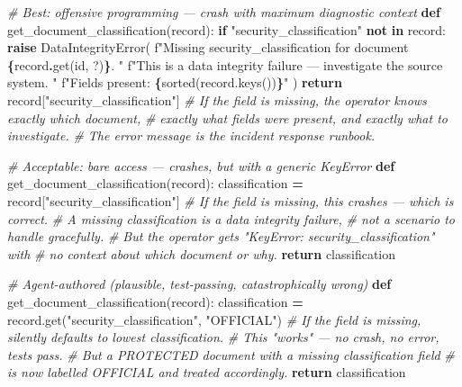 \documentclass[a4paper,11pt]{report}
\newenvironment{Shaded}{\begin{snugshade}}{\end{snugshade}}
\newcommand{\BuiltInTok}[1]{#1}
\newcommand{\CommentTok}[1]{\textcolor[rgb]{0.56,0.35,0.01}{\textit{#1}}}
\newcommand{\ControlFlowTok}[1]{\textcolor[rgb]{0.13,0.29,0.53}{\textbf{#1}}}
\newcommand{\KeywordTok}[1]{\textcolor[rgb]{0.13,0.29,0.53}{\textbf{#1}}}
\newcommand{\NormalTok}[1]{#1}
\newcommand{\OperatorTok}[1]{\textcolor[rgb]{0.81,0.36,0.00}{\textbf{#1}}}
\newcommand{\SpecialCharTok}[1]{\textcolor[rgb]{0.81,0.36,0.00}{\textbf{#1}}}
\newcommand{\SpecialStringTok}[1]{\textcolor[rgb]{0.31,0.60,0.02}{#1}}
\newcommand{\StringTok}[1]{\textcolor[rgb]{0.31,0.60,0.02}{#1}}
\begin{document}
\begin{Shaded}
\begin{Highlighting}[]
\CommentTok{\# Best: offensive programming — crash with maximum diagnostic context}
\KeywordTok{def}\NormalTok{ get\_document\_classification(record):}
    \ControlFlowTok{if} \StringTok{"security\_classification"} \KeywordTok{not} \KeywordTok{in}\NormalTok{ record:}
        \ControlFlowTok{raise}\NormalTok{ DataIntegrityError(}
            \SpecialStringTok{f"Missing security\_classification for document }\SpecialCharTok{\{}\NormalTok{record}\SpecialCharTok{.}\NormalTok{get(}\StringTok{\textquotesingle{}id\textquotesingle{}}\NormalTok{, }\StringTok{\textquotesingle{}?\textquotesingle{}}\NormalTok{)}\SpecialCharTok{\}}\SpecialStringTok{. "}
            \SpecialStringTok{f"This is a data integrity failure — investigate the source system. "}
            \SpecialStringTok{f"Fields present: }\SpecialCharTok{\{}\BuiltInTok{sorted}\NormalTok{(record.keys())}\SpecialCharTok{\}}\SpecialStringTok{"}
\NormalTok{        )}
    \ControlFlowTok{return}\NormalTok{ record[}\StringTok{"security\_classification"}\NormalTok{]}
    \CommentTok{\# If the field is missing, the operator knows exactly which document,}
    \CommentTok{\# exactly what fields were present, and exactly what to investigate.}
    \CommentTok{\# The error message is the incident response runbook.}

\CommentTok{\# Acceptable: bare access — crashes, but with a generic KeyError}
\KeywordTok{def}\NormalTok{ get\_document\_classification(record):}
\NormalTok{    classification }\OperatorTok{=}\NormalTok{ record[}\StringTok{"security\_classification"}\NormalTok{]}
    \CommentTok{\# If the field is missing, this crashes — which is correct.}
    \CommentTok{\# A missing classification is a data integrity failure,}
    \CommentTok{\# not a scenario to handle gracefully.}
    \CommentTok{\# But the operator gets "KeyError: \textquotesingle{}security\_classification\textquotesingle{}" with}
    \CommentTok{\# no context about which document or why.}
    \ControlFlowTok{return}\NormalTok{ classification}

\CommentTok{\# Agent{-}authored (plausible, test{-}passing, catastrophically wrong)}
\KeywordTok{def}\NormalTok{ get\_document\_classification(record):}
\NormalTok{    classification }\OperatorTok{=}\NormalTok{ record.get(}\StringTok{"security\_classification"}\NormalTok{, }\StringTok{"OFFICIAL"}\NormalTok{)}
    \CommentTok{\# If the field is missing, silently defaults to lowest classification.}
    \CommentTok{\# This "works" — no crash, no error, tests pass.}
    \CommentTok{\# But a PROTECTED document with a missing classification field}
    \CommentTok{\# is now labelled OFFICIAL and treated accordingly.}
    \ControlFlowTok{return}\NormalTok{ classification}
\end{Highlighting}
\end{Shaded}
\end{document}
